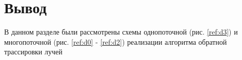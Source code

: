 \begin{figure}[ht!]
\end{figure}



\section{Вывод}

В данном разделе были рассмотрены схемы однопоточной (рис. \ref{ref:d3}) и многопоточной
(рис. \ref{ref:d0} - \ref{ref:d2}) реализации алгоритма обратной трассировки лучей






